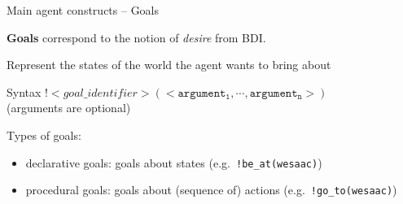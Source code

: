 \documentclass[compress]{beamer}
\newcommand{\desire}[1]{\textcolor{blue}{#1}}
\newcommand{\comment}[1]{\textcolor{harvestgold}{#1}}
\begin{document}
\begin{frame}{Main agent constructs -- Goals}

\footnotesize
 
 \vspace{0.5cm}
 
 {\bf Goals} correspond to the notion of \textit{desire} from BDI.\\ \vspace{.3cm}
 
 Represent the states of the world the agent wants to bring about\\
 \vspace{0.5cm}
 
 \begin{block}{Syntax}
  $!<goal\_identifier>\mathtt{(<argument_1,\cdots,argument_n>)}$\\
  {\tiny (arguments are optional)}
 \end{block}

 \vspace{0.5cm}
 
 Types of goals:
   \begin{itemize}
   \item declarative goals: goals about states {\tiny (e.g.~\texttt{!be\_at(wesaac)})}
   \item procedural goals: goals about (sequence of) actions {\tiny (e.g.~\texttt{!go\_to(wesaac)})}
  \end{itemize}
 




\vfill
 \\ 
 
\end{frame}
\end{document}
